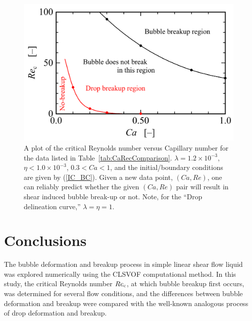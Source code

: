 \documentclass[%
 reprint,
 showkeys,
 amsmath,amssymb,
 aps,
 prfluids,
 onecolumn
]{revtex4-2}
\begin{document}
\begin{figure}%
  \centering
  \includegraphics[width=\textwidth]{CaRecFit}
  \caption{A plot of the critical Reynolds number versus Capillary number
	for the data listed in Table~\ref{tab:CaRecComparison}.  
	$\lambda = 1.2 \times 10^{-3}$, 
	$\eta < 1.0 \times 10^{-3}$, $0.3<Ca<1$, and
        the initial/boundary conditions are given by (\ref{IC_BC}).
	Given a new data point, $(Ca,Re)$, one
	can reliably predict whether the 
	given $(Ca,Re)$ pair will result in shear
	induced bubble break-up or not.  Note, for the ``Drop delineation
	curve,'' $\lambda=\eta=1$.
	   }
  \label{fig:CaRecFit}
\end{figure}
%

\section{Conclusions}
The bubble deformation and breakup process in simple linear shear flow liquid
was explored numerically using the CLSVOF computational method.  In this study,
the critical Reynolds number $Re_{\rm c}$, at which bubble breakup first occurs,
was determined for several flow conditions, and the differences between bubble
deformation and breakup were compared with the well-known analogous process of
drop deformation and breakup.
\end{document}
